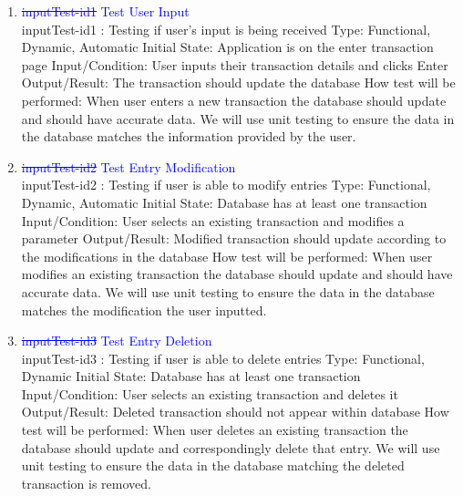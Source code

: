 \documentclass[12pt, titlepage]{article}
\begin{document}
\begin{enumerate}

\item{\textcolor{blue}{\st{inputTest-id1} Test User Input}\\}
inputTest-id1 : Testing if user’s input is being received
\newline
Type: Functional, Dynamic, Automatic
\newline
Initial State: Application is on the enter transaction page
\newline
Input/Condition: User inputs their transaction details and clicks Enter
\newline
Output/Result: The transaction should update the database 
\newline
How test will be performed: When user enters a new transaction the database should update and should have accurate data. We will use unit testing to ensure the data in the database matches the information provided by the user.

					
\item{\textcolor{blue}{\st{inputTest-id2} Test Entry Modification}\\}
inputTest-id2 : Testing if user is able to modify entries
\newline
Type: Functional, Dynamic, Automatic
\newline
Initial State: Database has at least one transaction
\newline
Input/Condition: User selects an existing transaction and modifies a parameter
\newline
Output/Result: Modified transaction should update according to the modifications in the database
\newline
How test will be performed: When user modifies an existing transaction the database should update and should have accurate data. We will use unit testing to ensure the data in the database matches the modification the user inputted.

\item{\textcolor{blue}{\st{inputTest-id3} Test Entry Deletion}\\}
inputTest-id3 : Testing if user is able to delete entries
\newline
Type: Functional, Dynamic
\newline
Initial State: Database has at least one transaction
\newline
Input/Condition: User selects an existing transaction and deletes it
\newline
Output/Result: Deleted transaction should not appear within database
\newline
How test will be performed: When user deletes an existing transaction the database should update and correspondingly delete that entry. We will use unit testing to ensure the data in the database matching the deleted transaction is removed.


\end{enumerate}
\end{document}
